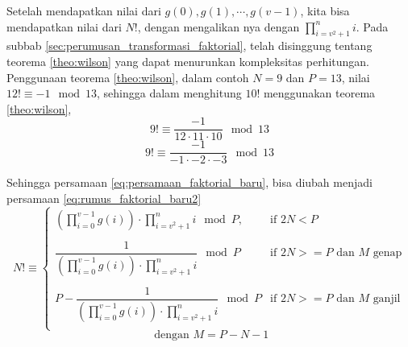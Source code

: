 Setelah mendapatkan nilai dari $ g(0), g(1), \cdots, g(v-1) $, kita bisa mendapatkan nilai dari $ N! $, dengan mengalikan nya dengan $ \prod_{i=v^2+1}^n i $. Pada subbab \ref{sec:perumusan_transformasi_faktorial}, telah disinggung tentang teorema \ref{theo:wilson} yang dapat menurunkan kompleksitas perhitungan. Penggunaan teorema \ref{theo:wilson}, dalam contoh $ N = 9 $ dan $ P = 13 $, nilai $ 12! \equiv -1 \mod{13} $, sehingga dalam menghitung $ 10! $ menggunakan teorema \ref{theo:wilson}, 
$$ 9! \equiv \frac{-1}{12 \cdot 11 \cdot 10} \mod{13} $$
$$ 9! \equiv \frac{-1}{-1 \cdot -2 \cdot -3} \mod{13} $$

Sehingga persamaan \eqref{eq:persamaan_faktorial_baru}, bisa diubah menjadi persamaan \eqref{eq:rumus_faktorial_baru2}
\begin{equation}
	N! \equiv
	\begin{cases}
		\left( \displaystyle\prod\limits_{i=0}^{v-1} g(i) \right) \cdot \displaystyle\prod\limits_{i=v^2+1}^n i \mod{P}, 	      & \text{if } 2N < P \\\\
		\dfrac{1}{\left( \displaystyle\prod\limits_{i=0}^{v-1} g(i) \right) \cdot \displaystyle\prod\limits_{i=v^2+1}^n i} \mod{P}
		& \text{if } 2N >= P \text{ dan } M \text{ genap}\\\\
		P -\dfrac{1}{\left( \displaystyle\prod\limits_{i=0}^{v-1} g(i) \right) \cdot \displaystyle\prod\limits_{i=v^2+1}^n i} \mod{P}
		& \text{if } 2N >= P \text{ dan } M \text{ ganjil} \\
	\end{cases}
	\label{eq:rumus_faktorial_baru2}
\end{equation}
$$ \text{ dengan } M = P-N-1 $$

